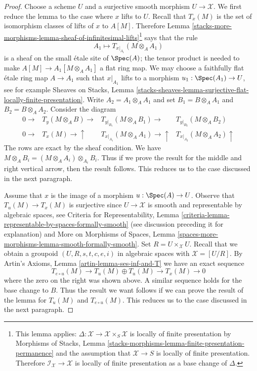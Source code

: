 \begin{proof}
Choose a scheme $U$ and a surjective smooth morphism $U \to \mathcal{X}$.
We first reduce the lemma to the case where $x$ lifts to $U$.
Recall that $T_x(M)$ is the set of isomorphism classes of lifts of $x$
to $A[M]$. Therefore
Lemma \ref{stacks-more-morphisms-lemma-sheaf-of-infinitesimal-lifts}\footnote{This lemma applies:
$\Delta : \mathcal{X} \to \mathcal{X} \times_S \mathcal{X}$
is locally of finite presentation by
Morphisms of Stacks, Lemma
\ref{stacks-morphisms-lemma-finite-presentation-permanence}
and the assumption that $\mathcal{X} \to S$ is locally of finite presentation.
Therefore $\mathcal{I}_\mathcal{X} \to \mathcal{X}$ is locally
of finite presentation as a base change of $\Delta$.}
says that the rule
$$
A_1 \mapsto T_{x|_{A_1}}(M \otimes_A A_1)
$$
is a sheaf on the small \'etale site of $\Spec(A)$; the tensor product
is needed to make $A[M] \to A_1[M \otimes_A A_1]$ a flat ring map.
We may choose a faithfully flat \'etale ring map $A \to A_1$
such that $x|_{A_1}$ lifts to a morphism $u_1 : \Spec(A_1) \to U$, see
for example Sheaves on Stacks, Lemma
\ref{stacks-sheaves-lemma-surjective-flat-locally-finite-presentation}.
Write $A_2 = A_1 \otimes_A A_1$ and set $B_1 = B \otimes_A A_1$
and $B_2 = B \otimes_A A_2$. Consider the diagram
$$
\begin{array}{cccc}0 \longrightarrow & T_y(M \otimes_A B) \longrightarrow & T_{y|_{B_1}}(M \otimes_A B_1) \longrightarrow & T_{y|_{B_2}}(M \otimes_A B_2) \\ 0 \longrightarrow & T_x(M) \longrightarrow\uparrow & T_{x|_{A_1}}(M \otimes_A A_1) \longrightarrow\uparrow & T_{x|_{A_2}}(M \otimes_A A_2) \uparrow\end{array}
$$
The rows are exact by the sheaf condition. We have
$M \otimes_A B_i = (M \otimes_A A_i) \otimes_{A_i} B_i$.
Thus if we prove the result for the middle and right vertical arrow, then
the result follows. This reduces us to the case discussed in
the next paragraph.

\medskip\noindent
Assume that $x$ is the image of a morphism $u : \Spec(A) \to U$.
Observe that $T_u(M) \to T_x(M)$ is surjective since
$U \to \mathcal{X}$ is smooth and representable by
algebraic spaces, see Criteria for Representability, Lemma
\ref{criteria-lemma-representable-by-spaces-formally-smooth}
(see discussion preceding it for explanation) and
More on Morphisms of Spaces, Lemma
\ref{spaces-more-morphisms-lemma-smooth-formally-smooth}.
Set $R = U \times_\mathcal{X} U$. Recall that we obtain
a groupoid $(U, R, s, t, c, e, i)$ in algebraic spaces with
$\mathcal{X} = [U/R]$. By
Artin's Axioms, Lemma \ref{artin-lemma-ses-inf-and-T}
we have an exact sequence
$$
T_{e \circ u}(M) \to T_u(M) \oplus T_u(M) \to T_x(M) \to 0
$$
where the zero on the right was shown above. A similar sequence
holds for the base change to $B$. Thus the result we want follows if
we can prove the result of the lemma for
$T_u(M)$ and $T_{e \circ u}(M)$. This reduces us to the case discussed
in the next paragraph.


\end{proof}
